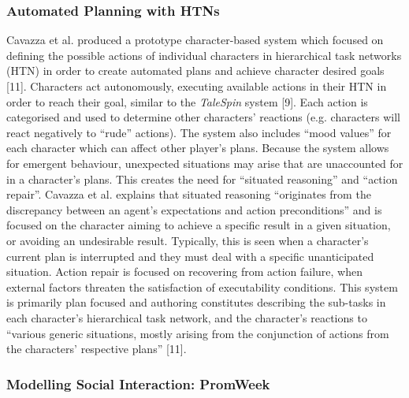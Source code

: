 \documentclass{sig-alternate-05-2015}
\begin{document}
\subsubsection{Automated Planning with HTNs}

Cavazza et al. produced a prototype character-based system which focused on defining the possible actions of individual characters in hierarchical task networks (HTN) in order to create automated plans and achieve character desired goals [11]. Characters act autonomously, executing available actions in their HTN in order to reach their goal, similar to the \textit{TaleSpin} system [9].  Each action is categorised and used to determine other characters' reactions (e.g. characters will react negatively to ``rude'' actions). The system also includes ``mood values'' for each character which can affect other player's plans. Because the system allows for emergent behaviour, unexpected situations may arise that are unaccounted for in a character's plans. This creates the need for ``situated reasoning'' and ``action repair''. Cavazza et al. explains that situated reasoning ``originates from the discrepancy between an agent's expectations and action preconditions'' and is focused on the character aiming to achieve a specific result in a given situation, or avoiding an undesirable result. Typically, this is seen when a character's current plan is interrupted and they must deal with a specific unanticipated situation. Action repair is focused on recovering from action failure, when external factors threaten the satisfaction of executability conditions. This system is primarily plan focused and authoring constitutes describing the sub-tasks in each character's hierarchical task network, and the character's reactions to ``various generic situations, mostly arising
from the conjunction of actions from the characters'
respective plans'' [11].\\ 

\subsubsection{Modelling Social Interaction: PromWeek}
\end{document}
